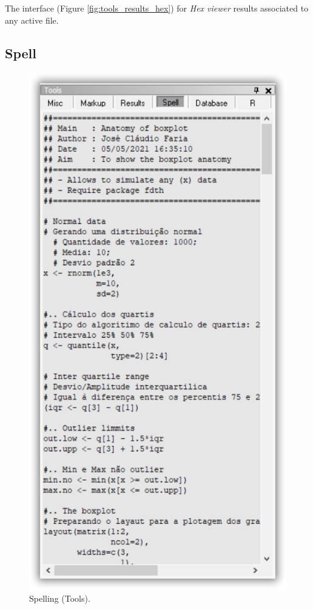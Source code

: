 The interface
(Figure \ref{fig:tools_results_hex})
for \textit{Hex viewer} results associated to any active file.


\hypertarget{working_tools_spell}{}
\subsection{Spell}

\begin{figure}[H]
  \includegraphics[scale=0.35]{./res/tools_spell.png}
  \caption{Spelling (Tools).}
  \label{fig:tools_spell}
\end{figure}

